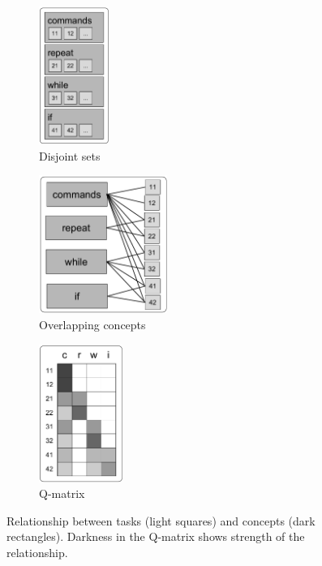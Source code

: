 \begin{figure}[htb]
\centering
\begin{subfigure}[t]{0.25\textwidth}
\centering
\includegraphics[height=45mm]{img/concepts-tasks-disjoint}
\caption{Disjoint sets}
\label{fig:concepts-tasks-disjoint}
\end{subfigure}%
\begin{subfigure}[t]{0.44\textwidth}
\centering
\includegraphics[height=45mm]{img/concepts-tasks-overlapping}
\caption{Overlapping concepts}
\label{fig:concepts-tasks-overlapping}
\end{subfigure}
\begin{subfigure}[t]{0.3\textwidth}
\centering
\includegraphics[height=45mm]{img/concepts-tasks-qmatrix}
\caption{Q-matrix}
\label{fig:concepts-tasks-qmatrix}
\end{subfigure}
\caption{%
  Relationship between tasks (light squares) and concepts (dark rectangles).
  Darkness in the Q-matrix shows strength of the relationship.} %
\label{fig:concepts-tasks-relationships}
\end{figure}




